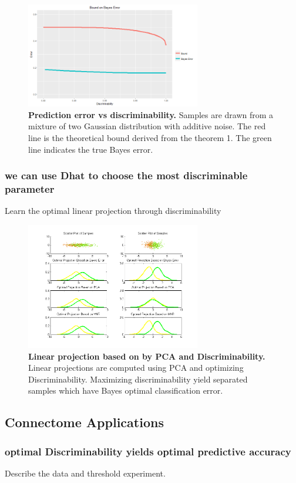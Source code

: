 \documentclass{article}
\begin{document}
\begin{figure}[ht!]
	\includegraphics[width=3.0in]{../Figs/theo_plot.png}
	\caption{{\bf Prediction error vs discriminability.} Samples are drawn from a mixture of two Gaussian distribution with additive noise. The red line is the theoretical bound derived from the theorem 1. The green line indicates the true Bayes error. }
	\label{fig:1}
\end{figure}


\subsubsection{we can use Dhat to choose the most discriminable parameter }
 Learn the optimal linear projection through discriminability

\begin{figure}[ht!]
	\includegraphics[width=3.0in]{../Figs/parameter_selection_2sub.png}
	\caption{{\bf Linear projection based on by PCA and Discriminability.} Linear projections are computed using PCA and optimizing Discriminability. Maximizing discriminability yield separated samples which have Bayes optimal classification error. }
	\label{fig:3}
\end{figure}


\subsection{Connectome Applications}

\subsubsection{optimal Discriminability yields optimal predictive accuracy}
 Describe the data and threshold experiment. 
\end{document}
